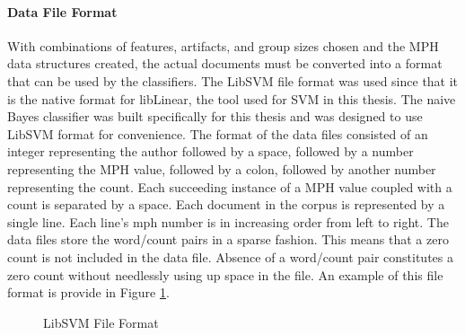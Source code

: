 		\paragraph{Data File Format}With combinations of features, artifacts, and group sizes chosen and the MPH data structures created, the actual documents must be converted into a format that can be used by the classifiers. The LibSVM file format was used since that it is the native format for libLinear, the tool used for SVM in this thesis.  The naive Bayes classifier was built specifically for this thesis and was designed to use LibSVM format for convenience. The format of the data files consisted of an integer representing the author followed by a space, followed by a number representing the MPH value, followed by a colon, followed by another number representing the count.  Each succeeding instance of a MPH value coupled with a count is separated by a space.  Each document in the corpus is represented by a single line.  Each line's mph number is in increasing order from left to right.  The data files store the word/count pairs in a sparse fashion.  This means that a zero count is not included in the data file.  Absence of a word/count pair constitutes a zero count without needlessly using up space in the file.  An example of this file format is provide in Figure \ref{fig:svmFormat}.
		\begin{figure}[ht!]
			\begin{center}
				\caption{LibSVM File Format}
				\label{fig:svmFormat}
			\end{center}
		\end{figure}
	
